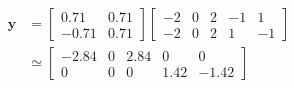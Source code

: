 \begin{align}
  \mathbf{y} &=
  \begin{bmatrix}
     0.71 & 0.71 \\
    -0.71 & 0.71
  \end{bmatrix}
  \begin{bmatrix}
    -2 & 0 & 2 & -1 &  1 \\
    -2 & 0 & 2 &  1 & -1
 \end{bmatrix}
 \\
 &\simeq
 \begin{bmatrix}
  -2.84 & 0 & 2.84 & 0    &  0 \\
   0    & 0 & 0    & 1.42 & -1.42
\end{bmatrix}
\end{align}





